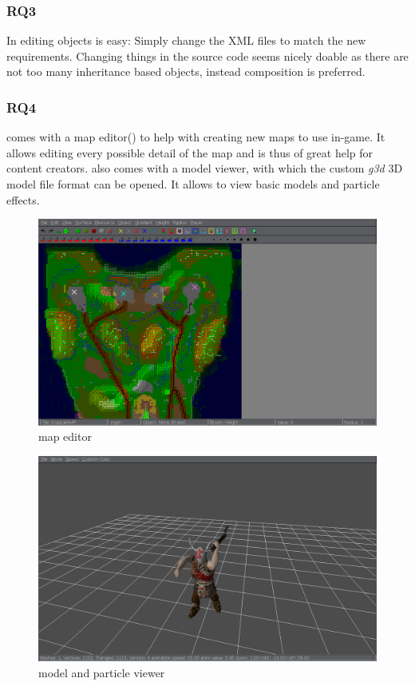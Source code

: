 \subsubsection{RQ3}
In \GLEST{} editing objects is easy: Simply change the XML files to match the new requirements. Changing things in the
source code seems nicely doable as there are not too many inheritance based objects, instead composition is preferred.

\subsubsection{RQ4}
\GLEST{} comes with a map editor() to help with creating new maps to use in-game. It allows editing every possible detail
of the map and is thus of great help for content creators. \GLEST{} also comes with a model viewer, with which the
custom \textit{g3d} 3D model file format can be opened. It allows to view basic models and particle effects.

\begin{figure}[h!]
    \centering
    \includegraphics[width=\textwidth]{pics/glesteditor}
    \caption{\GLEST{} map editor}
    \label{fig:glestmapeditor}
\end{figure}

\begin{figure}[h!]
    \centering
    \includegraphics[width=\textwidth]{pics/glestmodelviewer}
    \caption{\GLEST{} model and particle viewer}
    \label{fig:glestmodelviewer}
\end{figure}

